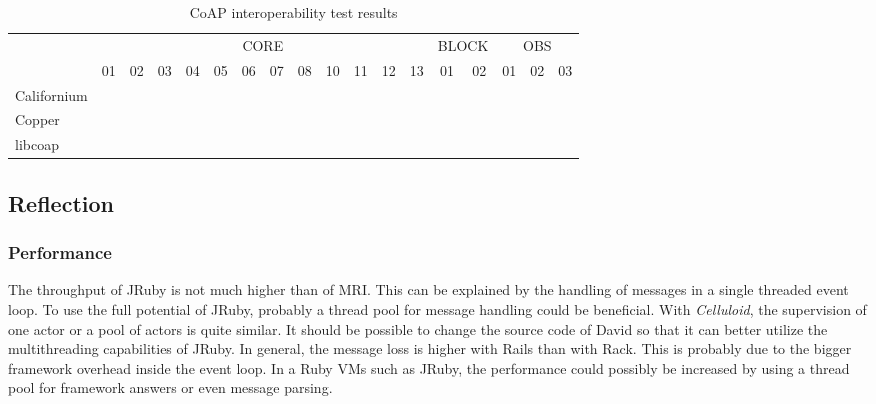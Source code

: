 			\begin{landscape}
				\begin{table}
					\begin{center}
						\begin{tabular}{l|cccccccccccc|cc|ccc|}
							& \multicolumn{12}{|c|}{CORE} & \multicolumn{2}{|c|}{BLOCK} & \multicolumn{3}{|c|}{OBS} \\
							& 01 & 02 & 03 & 04 & 05 & 06 & 07 & 08 & 10 & 11 & 12 & 13 & 01 & 02 & 01 & 02 & 03 \\
							\hline
							Californium	& \y & \y & \y & \y & \y & \y & \y & \y & \y & \y & \y & \y & \y & \y & \y & \n & \n \\
							Copper		& \y & \y & \y & \y & \y & \y & \y & \y & \y & \y & \y & \y & \y & \y & \y & \y & \y \\
							libcoap		& \y & \y & \y & \y & \y & \y & \y & \y & \y & \y & \y & \y & \y & \y & \y & \y & \y \\
							\hline
						\end{tabular}
					\end{center}
					\caption{\ac{CoAP} interoperability test results}
					\label{table:evaluation:interoperability:coap:results}
				\end{table}
			\end{landscape}

	\subsection{Reflection}

		\subsubsection{Performance}
		

			The throughput of JRuby is not much higher than of \ac{MRI}. This
			can be explained by the handling of messages in a single threaded
			event loop. To use the full potential of JRuby, probably a thread
			pool for message handling could be beneficial. With
			\emph{Celluloid}, the supervision of one actor or a pool of actors
			is quite similar. It should be possible to change the source code
			of David so that it can better utilize the multithreading
			capabilities of JRuby. In general, the message loss is higher with
			\ac{Rails} than with Rack. This is probably due to the bigger
			framework overhead inside the event loop. In a Ruby \acp{VM} such
			as JRuby, the performance could possibly be increased by using a
			thread pool for framework answers or even message parsing.

